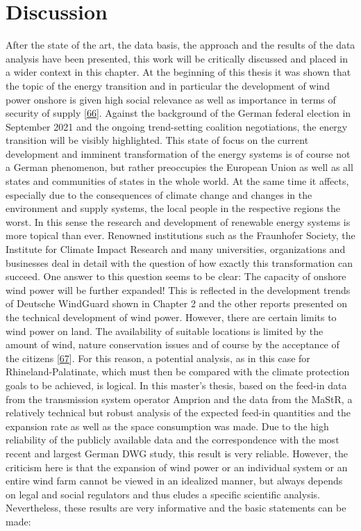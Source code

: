 \documentclass[a4paper,11pt]{article}
\begin{document}
\newpage

\hypertarget{discussion}{%
\section{Discussion}\label{discussion}}

After the state of the art, the data basis, the approach and the results of the data analysis have been presented, this work will be critically discussed and placed in a wider context in this chapter. At the beginning of this thesis it was shown that the topic of the energy transition and in particular the development of wind power onshore is given high social relevance as well as importance in terms of security of supply {[}\protect\hyperlink{ref-ARD.2021}{66}{]}. Against the background of the German federal election in September 2021 and the ongoing trend-setting coalition negotiations, the energy transition will be visibly highlighted. This state of focus on the current development and imminent transformation of the energy systems is of course not a German phenomenon, but rather preoccupies the European Union as well as all states and communities of states in the whole world. At the same time it affects, especially due to the consequences of climate change and changes in the environment and supply systems, the local people in the respective regions the worst. In this sense the research and development of renewable energy systems is more topical than ever. Renowned institutions such as the Fraunhofer Society, the Institute for Climate Impact Research and many universities, organizations and businesses deal in detail with the question of how exactly this transformation can succeed. One answer to this question seems to be clear: The capacity of onshore wind power will be further expanded! This is reflected in the development trends of Deutsche WindGuard shown in Chapter 2 and the other reports presented on the technical development of wind power. However, there are certain limits to wind power on land. The availability of suitable locations is limited by the amount of wind, nature conservation issues and of course by the acceptance of the citizens {[}\protect\hyperlink{ref-Stede.2019}{67}{]}. For this reason, a potential analysis, as in this case for Rhineland-Palatinate, which must then be compared with the climate protection goals to be achieved, is logical. In this master's thesis, based on the feed-in data from the transmission system operator Amprion and the data from the MaStR, a relatively technical but robust analysis of the expected feed-in quantities and the expansion rate as well as the space consumption was made. Due to the high reliability of the publicly available data and the correspondence with the most recent and largest German DWG study, this result is very reliable. However, the criticism here is that the expansion of wind power or an individual system or an entire wind farm cannot be viewed in an idealized manner, but always depends on legal and social regulators and thus eludes a specific scientific analysis. Nevertheless, these results are very informative and the basic statements can be made:
\end{document}
